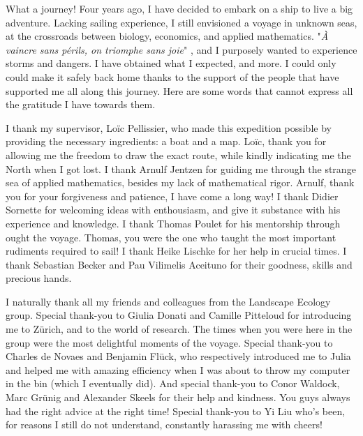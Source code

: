 %
\label{sec:acknowledgement}


What a journey!
% 
Four years ago, I have decided to embark on a ship to live a big adventure.
% 
Lacking sailing experience, I still envisioned a voyage in unknown seas, at the crossroads between biology, economics, and applied mathematics.
% 
"\textit{À vaincre sans périls, on triomphe sans joie}" \citep{maufrais1997aventures}, and I purposely wanted to experience storms and dangers.
% 
I have obtained what I expected, and more.
% 
I could only could make it safely back home thanks to the support of the people that have supported me all along this journey. Here are some words that cannot express all the gratitude I have towards them.

I thank my supervisor, Loïc Pellissier, who made this expedition possible by providing the necessary ingredients: a boat and a map. Loïc, thank you for allowing me the freedom to draw the exact route, while kindly indicating me the North when I got lost.
% 
I thank Arnulf Jentzen for guiding me through the strange sea of applied mathematics, besides my lack of mathematical rigor. Arnulf, thank you for your forgiveness and patience, I have come a long way!
% 
I thank Didier Sornette for welcoming ideas with enthousiasm, and give it substance with his experience and knowledge.
% 
I thank Thomas Poulet for his mentorship through ought the voyage. Thomas, you were the one who taught the most important rudiments required to sail! 
% 
I thank Heike Lischke for her help in crucial times.
% 
I thank Sebastian Becker and Pau Vilimelis Aceituno for their goodness, skills and precious hands.
% 

% 
I naturally thank all my friends and colleagues from the Landscape Ecology group. Special thank-you to Giulia Donati and Camille Pitteloud for introducing me to Zürich, and to the world of research. The times when you were here in the group were the most delightful moments of the voyage.
% 
Special thank-you to Charles de Novaes and Benjamin Flück, who respectively introduced me to Julia and helped me with amazing efficiency when I was about to throw my computer in the bin (which I eventually did).
% 
And special thank-you to Conor Waldock, Marc Grünig and Alexander Skeels for their help and kindness. You guys always had the right advice at the right time!
% 
Special thank-you to Yi Liu who's been, for reasons I still do not understand, constantly harassing me with cheers! 

